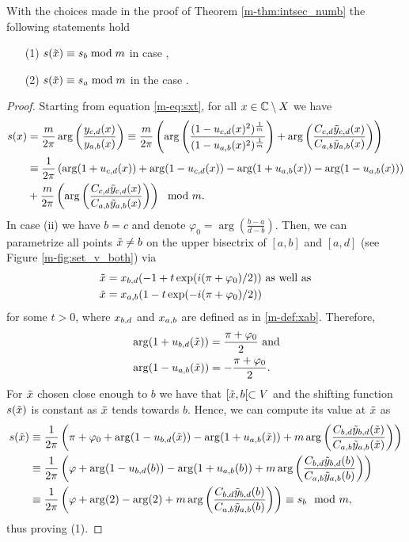 \documentclass[main.tex]{subfiles}
\begin{document}
\begin{lemma}\label{lemma:sxt=sx}
  With the choices made in the proof of Theorem \ref{m-thm:intsec_numb} the following statements hold
  \begin{itemize}
   \item[(1)] $s(\tilde{x}) \equiv s_b \bmod m$ in case {},
    \item[(2)]  $s(\tilde{x}) \equiv s_a \bmod m$ in the case {}.
  \end{itemize}
\end{lemma}
 \begin{proof}
 Starting from equation \eqref{m-eq:sxt}, for all $x \in \mathbb{C} \setminus X$ we have
   \begin{align*}
   s(x) & = \frac{m}{2\pi} \arg \left( \frac{y_{c,d}(x)}{y_{a,b}(x)} \right)
   \equiv \frac{m}{2\pi} \left( \arg \left( \frac{(1- u_{c,d}(x)^2)^{\frac{1}{m}}}{(1-u_{a,b}(x)^2)^{\frac{1}{m}}} \right) + \arg \left( \frac{ C_{c,d} \tilde{y}_{c,d}(x)}{C_{a,b}
   \tilde{y}_{a,b}(x)} \right) \right) \\
   & \equiv \frac{1}{2\pi} \left( \arg(1+u_{c,d}(x)) + \arg(1-u_{c,d}(x)) - \arg(1+u_{a,b}(x)) - \arg(1-u_{a,b}(x)) \right) \\
   & +  \frac{m}{2\pi} \left( \arg \left( \frac{ C_{c,d} \tilde{y}_{c,d}(x)}{C_{a,b}\tilde{y}_{a,b}(x)} \right)\right) \mod m.
  \end{align*}
 In case (ii) we have $b = c$ and denote $\varphi_0 = \arg \left( \frac{b-a}{d-b} \right)$. Then, we can parametrize all points $\tilde{x} \ne b$ on
 the upper bisectrix of $[a,b]$ and
 $[a,d]$ (see Figure \ref{m-fig:set_v_both}) via
 \begin{align*}
  \tilde{x} & = x_{b,d}(-1+t \exp(i(\pi+\varphi_0)/2)) \text{  as well as} \\
  \tilde{x} & = x_{a,b}(1-t \exp(-i (\pi+\varphi_0)/2))
 \end{align*}
 for some $t > 0$, where $x_{b,d}$ and $x_{a,b}$ are defined as in \eqref{m-def:xab}. Therefore,
 \begin{align*}
   & \arg (1+u_{b,d}(\tilde{x})) = \frac{\pi+\varphi_0}{2} \text{ and} \\
   & \arg (1-u_{a,b}(\tilde{x})) = -\frac{\pi+\varphi_0}{2}.
 \end{align*}
 For $\tilde{x}$ chosen close enough to $b$ we have that $[\tilde{x},b[ \subset V$ and the shifting function $s(\tilde{x})$ is constant as $\tilde{x}$ tends towards $b$. Hence,
 we can compute its value at $\tilde{x}$ as
 \begin{align*}
  s(\tilde{x}) & \equiv \frac{1}{2\pi} \left( \pi + \varphi_0 + \arg(1-u_{b,d}(\tilde{x})) - \arg(1+u_{a,b}(\tilde{x})) +  m \arg \left( \frac{ C_{b,d} \tilde{y}_{b,d}(\tilde{x})}{C_{a,b}\tilde{y}_{a,b}(\tilde{x})} \right)\right) \\
	 & \equiv \frac{1}{2\pi} \left ( \varphi +\arg(1-u_{b,d}(b)) - \arg(1+u_{a,b}(b)) +  m \arg \left( \frac{ C_{b,d} \tilde{y}_{b,d}(b)}{C_{a,b}\tilde{y}_{a,b}(b)} \right)\right) \\
	 & \equiv \frac{1}{2\pi} \left( \varphi +\arg(2) - \arg(2) +  m \arg \left( \frac{ C_{b,d} \tilde{y}_{b,d}(b)}{C_{a,b}\tilde{y}_{a,b}(b)} \right)\right) \equiv s_b \mod m,
 \end{align*}
thus proving (1).


\end{proof}
\end{document}
